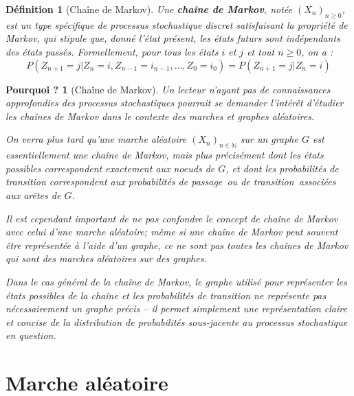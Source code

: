 \documentclass{article}
\theoremstyle{pasdepoint}
\newtheorem{definition}{Définition}
\theoremstyle{break}
\theoremstyle{pasdepoint}
\newtheorem*{pourquoi}{Pourquoi ?}
\begin{document}
\begin{definition}[Chaîne de Markov]
    Une \textbf{chaîne de Markov}, notée $(X_n)_{n \geq 0}$, est un type spécifique de processus stochastique discret satisfaisant la propriété de Markov, qui stipule que, donné l'état présent, les états futurs sont indépendants des états passés. Formellement, pour tous les états $i$ et $j$ et tout $n \geq 0$, on a :
    \[
    P(Z_{n+1} = j | Z_n = i, Z_{n-1} = i_{n-1}, \ldots, Z_0 = i_0) = P(Z_{n+1} = j | Z_n = i)
    \]
\end{definition}

\begin{pourquoi}[Chaîne de Markov]
    Un lecteur n'ayant pas de connaissances approfondies des processus stochastiques pourrait se demander l'intérêt d'étudier les chaînes de Markov dans le contexte des marches et graphes aléatoires.

    On verra plus tard qu'une marche aléatoire \((X_n)_{n\in\mathbb{N}}\) sur un graphe \(G\) est essentiellement une chaîne de Markov, mais plus précisément dont les états possibles correspondent exactement aux noeuds de \(G\), et dont les probabilités de transition correspondent aux probabilités de \guillemotleft passage\guillemotright\ ou de \guillemotleft transition\guillemotright\ associées aux arêtes de \(G\).

    Il est cependant important de ne pas confondre le concept de chaîne de Markov avec celui d'une marche aléatoire; même si une chaîne de Markov peut souvent être représentée à l'aide d'un graphe, ce ne sont pas toutes les chaînes de Markov qui sont des marches aléatoires sur des graphes.
    
    Dans le cas général de la chaîne de Markov, le graphe utilisé pour représenter les états possibles de la chaîne et les probabilités de transition ne représente pas nécessairement un graphe précis -- il permet simplement une représentation claire et concise de la distribution de probabilités sous-jacente au processus stochastique en question.
\end{pourquoi}

\pagebreak \section{Marche aléatoire}
\end{document}
